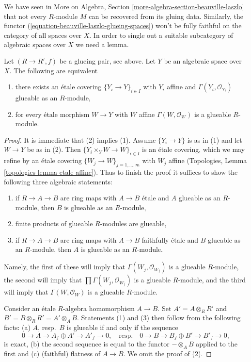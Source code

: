 \medskip\noindent
We have seen in
More on Algebra, Section \ref{more-algebra-section-beauville-laszlo}
that not every $R$-module $M$ can be recovered from its
gluing data. Similarly, the functor
(\ref{equation-beauville-laszlo-glueing-spaces})
won't be fully faithful on the category of all spaces over $X$.
In order to single out a suitable subcategory of algebraic
spaces over $X$ we need a lemma.

\begin{lemma}
\label{lemma-glueable}
Let $(R \to R', f)$ be a glueing pair, see above. Let $Y$ be an algebraic
space over $X$. The following are equivalent
\begin{enumerate}
\item there exists an \'etale covering $\{Y_i \to Y\}_{i \in I}$
with $Y_i$ affine and $\Gamma(Y_i, \mathcal{O}_{Y_i})$
glueable as an $R$-module,
\item for every \'etale morphism $W \to Y$ with $W$ affine
$\Gamma(W, \mathcal{O}_W)$ is a glueable $R$-module.
\end{enumerate}
\end{lemma}

\begin{proof}
It is immediate that (2) implies (1). Assume $\{Y_i \to Y\}$
is as in (1) and let $W \to Y$ be as in (2). Then
$\{Y_i \times_Y W \to W\}_{i \in I}$ is an \'etale covering,
which we may refine by an \'etale covering
$\{W_j \to W\}_{j = 1, \ldots, m}$ with $W_j$ affine
(Topologies, Lemma \ref{topologies-lemma-etale-affine}).
Thus to finish the proof it suffices to show
the following three algebraic statements:
\begin{enumerate}
\item if $R \to A \to B$ are ring maps with $A \to B$ \'etale
and $A$ glueable as an $R$-module, then $B$ is glueable as an
$R$-module,
\item finite products of glueable $R$-modules are glueable,
\item if $R \to A \to B$ are ring maps with $A \to B$ faithfully \'etale
and $B$ glueable as an $R$-module, then $A$ is glueable as an
$R$-module.
\end{enumerate}
Namely, the first of these will imply that $\Gamma(W_j, \mathcal{O}_{W_j})$
is a glueable $R$-module, the second will imply that
$\prod \Gamma(W_j, \mathcal{O}_{W_j})$ is a glueable $R$-module, and
the third will imply that $\Gamma(W, \mathcal{O}_W)$ is a glueable
$R$-module.

\medskip\noindent
Consider an \'etale $R$-algebra homomorphism $A \to B$. Set
$A' = A \otimes_R R'$ and $B' = B \otimes_R R' = A' \otimes_A B$.
Statements (1) and (3) then follow from the following facts:
(a) $A$, resp.\ $B$ is glueable if and only if the sequence
$$
0 \to A \to A_f \oplus A' \to A'_f \to 0,
\quad\text{resp.}\quad
0 \to B \to B_f \oplus B' \to B'_f \to 0,
$$
is exact, (b) the second sequence is equal to
the functor $- \otimes_A B$ applied to the first and
(c) (faithful) flatness of $A \to B$. We omit the proof of (2).
\end{proof}

